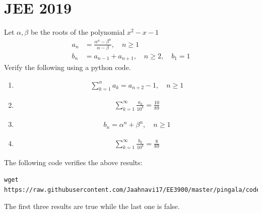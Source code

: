 \documentclass[journal,12pt,twocolumn]{IEEEtran}
\renewcommand\thesection{\arabic{section}}
\begin{document}
\section{JEE 2019}
Let $\alpha, \beta$ be the roots of the polynomial $x^2-x-1$\\
\begin{align}
	a_n &= \frac{\alpha^{n}-\beta^{n}}{\alpha - \beta}, \quad n \ge 1
	\\
	b_n &= a_{n-1} + a_{n+1}, \quad n \ge 2, \quad b_1 =1
	\label{eq:10-orig-diff}
\end{align}
Verify the following using a python code.
\begin{enumerate}[label=\thesection.\arabic*
,ref=\thesection.\theenumi]
\item 
\begin{align}
	\sum_{k=1}^{n}a_k = a_{n+2}-1, \quad n \ge 1
\end{align}
 \item 
\begin{align}
	\sum_{k=1}^{\infty}\frac{a_k}{10^k} =\frac{10}{89}
\end{align}
 \item 
\begin{align}
	b_n =\alpha^n + \beta^n, \quad n \ge 1 \label{eq:bn}
\end{align}
 \item 
\begin{align}
	\sum_{k=1}^{\infty}\frac{b_k}{10^k} =\frac{8}{89}
\end{align}
\end{enumerate}
\solution The following code verifies the above results:
	    \begin{lstlisting}
wget https://raw.githubusercontent.com/Jaahnavi17/EE3900/master/pingala/codes/1.py
\end{lstlisting}
The first three results are true while the last one is false.
\end{document}
